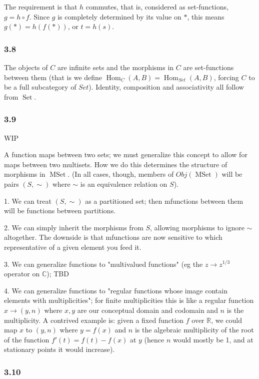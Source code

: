 \documentclass{article}
\DeclareMathOperator{\Hom}{Hom}
\DeclareMathOperator{\Set}{Set}
\DeclareMathOperator{\MSet}{MSet}
\def\R{\mathbb{R}}
\def\C{\mathbb{C}}
\begin{document}
The requirement is that $h$ commutes, that is, considered as set-functions, $g = h \circ f$. Since $g$ is completely determined by its value on $*$, this means $g(*) = h(f(*))$, or $t = h(s)$.

\subsubsection*{3.8}

The objects of $C$ are infinite sets and the morphisms in $C$ are set-functions between them (that is we define $\Hom_C(A, B) = \Hom_{Set}(A, B)$, forcing $C$ to be a full subcategory of $Set$). Identity, composition and associativity all follow from $\Set$.

\subsubsection*{3.9}

WIP

A function maps between two sets; we must generalize this concept to allow for maps between two multisets. How we do this determines the structure of morphisms in $\MSet$. (In all cases, though, members of $Obj(\MSet)$ will be pairs $(S, \sim)$ where $\sim$ is an equivalence relation on $S$).

1. We can treat $(S, \sim)$ as a partitioned set; then mfunctions between them will be functions between partitions.

2. We can simply inherit the morphisms from $S$, allowing morphisms to ignore $\sim$ altogether. The downside is that mfunctions are now sensitive to which representative of a given element you feed it.

3. We can generalize functions to "multivalued functions" (eg the $z \to z^{1/3}$ operator on $\C$); TBD

4. We can generalize functions to "regular functions whose image contain elements with multiplicities"; for finite multiplicities this is like a regular function $x \to (y, n)$ where $x, y$ are our conceptual domain and codomain and $n$ is the multiplicity. A contrived example is: given a fixed function $f$ over $\R$, we could map $x$ to $(y, n)$ where $y = f(x)$ and $n$ is the algebraic multiplicity of the root of the function $f'(t) = f(t) - f(x)$ at $y$ (hence $n$ would mostly be 1, and at stationary points it would increase).

\subsubsection*{3.10}
\end{document}
